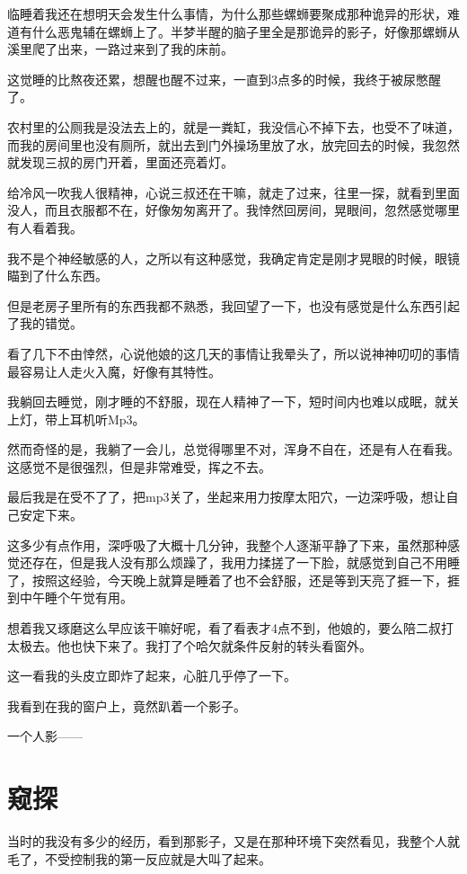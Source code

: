 临睡着我还在想明天会发生什么事情，为什么那些螺蛳要聚成那种诡异的形状，难道有什么恶鬼辅在螺蛳上了。半梦半醒的脑子里全是那诡异的影子，好像那螺蛳从溪里爬了出来，一路过来到了我的床前。

这觉睡的比熬夜还累，想醒也醒不过来，一直到3点多的时候，我终于被尿憋醒了。

农村里的公厕我是没法去上的，就是一粪缸，我没信心不掉下去，也受不了味道，而我的房间里也没有厕所，就出去到门外操场里放了水，放完回去的时候，我忽然就发现三叔的房门开着，里面还亮着灯。

给冷风一吹我人很精神，心说三叔还在干嘛，就走了过来，往里一探，就看到里面没人，而且衣服都不在，好像匆匆离开了。我悻然回房间，晃眼间，忽然感觉哪里有人看着我。

我不是个神经敏感的人，之所以有这种感觉，我确定肯定是刚才晃眼的时候，眼镜瞄到了什么东西。

但是老房子里所有的东西我都不熟悉，我回望了一下，也没有感觉是什么东西引起了我的错觉。

看了几下不由悻然，心说他娘的这几天的事情让我晕头了，所以说神神叨叨的事情最容易让人走火入魔，好像有其特性。

我躺回去睡觉，刚才睡的不舒服，现在人精神了一下，短时间内也难以成眠，就关上灯，带上耳机听Mp3。

然而奇怪的是，我躺了一会儿，总觉得哪里不对，浑身不自在，还是有人在看我。这感觉不是很强烈，但是非常难受，挥之不去。

最后我是在受不了了，把mp3关了，坐起来用力按摩太阳穴，一边深呼吸，想让自己安定下来。

这多少有点作用，深呼吸了大概十几分钟，我整个人逐渐平静了下来，虽然那种感觉还存在，但是我人没有那么烦躁了，我用力揉搓了一下脸，就感觉到自己不用睡了，按照这经验，今天晚上就算是睡着了也不会舒服，还是等到天亮了捱一下，捱到中午睡个午觉有用。

想着我又琢磨这么早应该干嘛好呢，看了看表才4点不到，他娘的，要么陪二叔打太极去。他也快下来了。我打了个哈欠就条件反射的转头看窗外。

这一看我的头皮立即炸了起来，心脏几乎停了一下。

我看到在我的窗户上，竟然趴着一个影子。

一个人影——

\chapter{窥探}

当时的我没有多少的经历，看到那影子，又是在那种环境下突然看见，我整个人就毛了，不受控制我的第一反应就是大叫了起来。

